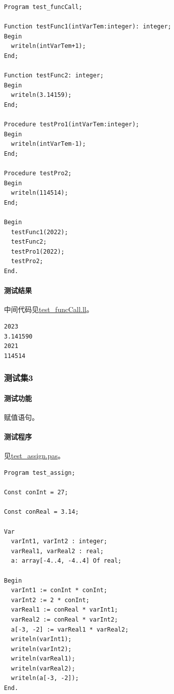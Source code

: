 \documentclass[lang=cn,11pt,a4paper,cite=authornum]{paper}
\begin{document}
\begin{code}
    \begin{verbatim}
Program test_funcCall;

Function testFunc1(intVarTem:integer): integer;
Begin
  writeln(intVarTem+1);
End;

Function testFunc2: integer;
Begin
  writeln(3.14159);
End;

Procedure testPro1(intVarTem:integer);
Begin
  writeln(intVarTem-1);
End;

Procedure testPro2;
Begin
  writeln(114514);
End;

Begin
  testFunc1(2022);
  testFunc2;
  testPro1(2022);
  testPro2;
End.
\end{verbatim}
\end{code}

\paragraph{测试结果} 中间代码见\href{run:../test/test_funcCall.ll}{test\_funcCall.ll}。

\begin{code}
    \begin{verbatim}
2023
3.141590
2021
114514
\end{verbatim}
\end{code}

\subsubsection{测试集3}

\paragraph{测试功能} 赋值语句。

\paragraph{测试程序} 见\href{run:../test/test_assign.pas}{test\_assign.pas}。

\begin{code}
    \begin{verbatim}
Program test_assign;

Const conInt = 27;

Const conReal = 3.14;

Var 
  varInt1, varInt2 : integer;
  varReal1, varReal2 : real;
  a: array[-4..4, -4..4] Of real;

Begin
  varInt1 := conInt * conInt;
  varInt2 := 2 * conInt;
  varReal1 := conReal * varInt1;
  varReal2 := conReal * varInt2;
  a[-3, -2] := varReal1 * varReal2;
  writeln(varInt1);
  writeln(varInt2);
  writeln(varReal1);
  writeln(varReal2);
  writeln(a[-3, -2]);
End.
\end{verbatim}
\end{code}
\end{document}
